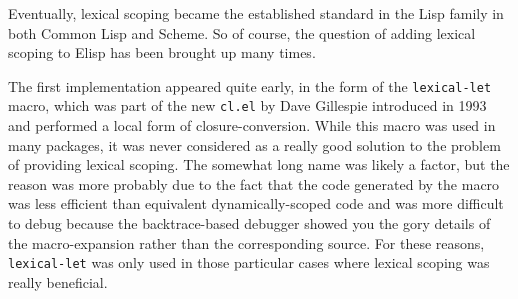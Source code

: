 \documentclass[format=acmsmall, review=false, screen=true]{acmart}
\newcommand \Elisp {Elisp}
\begin{document}

Eventually, lexical scoping became the established standard in
the Lisp family in both Common Lisp and Scheme.
So of course, the question of adding lexical scoping to \Elisp{} has been
brought up many times.

The first implementation appeared quite early, in the form of the
\texttt{lexical-let} macro, which was part of the new \texttt{cl.el} by Dave
Gillespie  introduced in 1993 and performed
a local form of closure-conversion.
While this macro was used in many packages, it was never considered as
a really good solution to the problem of providing lexical scoping.
The somewhat long name was likely a factor, but the reason was more probably
due to the fact that the code generated by the macro was less efficient than
equivalent dynamically-scoped code and was more difficult to debug because
the backtrace-based debugger showed you the gory details of the
macro-expansion rather than the corresponding source.  For these reasons,
\texttt{lexical-let} was only used in those particular cases where lexical
scoping was really beneficial.
\end{document}
